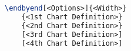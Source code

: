 \begin{lstlisting}[language=LaTeX, caption=End-by-End Charts Command, label=listing:end-by-end-charts]
\endbyend[<Options>]{<Width>}
    {<1st Chart Definition>}
    {<2nd Chart Definition>}
    [<3rd Chart Definition>]
    [<4th Chart Definition>]
\end{lstlisting}